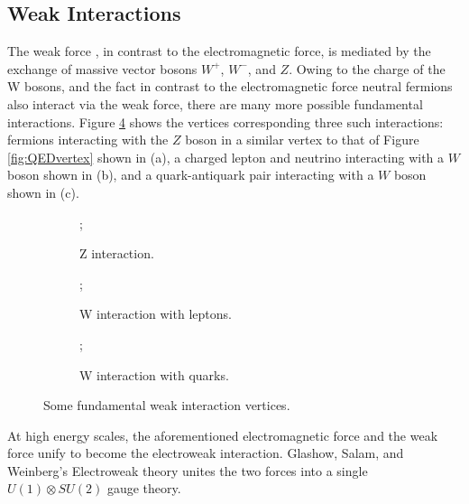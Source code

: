 \subsection{Weak Interactions}
The weak force \cite{pdg_rev,glashow,goldstone_weinberg_salam,weinberg}, in contrast to the electromagnetic force, is mediated by the exchange of massive vector bosons $W^+$, $W^-$, and $Z$. Owing to the charge of the W bosons, and the fact in contrast to the electromagnetic force neutral fermions also interact via the weak force, there are many more possible fundamental interactions. Figure \ref{fig:EWVertices} shows the vertices corresponding three such interactions: fermions interacting with the $Z$ boson in a similar vertex to that of Figure \ref{fig:QEDvertex} shown in (a), a charged lepton and neutrino interacting with a $W$ boson shown in (b), and a quark-antiquark pair interacting with a $W$ boson shown in (c).

\begin{figure}[h!]
    \begin{subfigure}{.5\textwidth}
        \centering
        ;
        \caption{Z interaction.}
        \label{fig:EWvertexa}
    \end{subfigure}
    \begin{subfigure}{.5\textwidth}
        \centering
        ;
        \caption{W interaction with leptons.}
        \label{fig:EWVertexb}
    \end{subfigure}
    \newline
    \begin{subfigure}{1\textwidth}
        \centering
        ;
        \caption{W interaction with quarks.}
        \label{fig:EWVertexc}
    \end{subfigure}
    \caption{Some fundamental weak interaction vertices.}
    \label{fig:EWVertices}
\end{figure}

At high energy scales, the aforementioned electromagnetic force and the weak force unify to become the electroweak interaction. Glashow, Salam, and Weinberg's Electroweak theory unites the two forces into a single $U(1) \otimes SU(2)$ gauge theory. 

